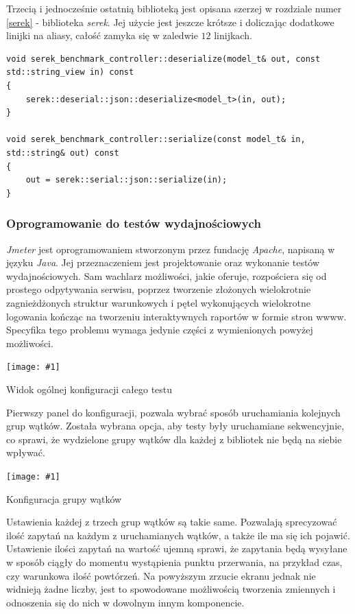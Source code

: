 \documentclass[12pt]{article}
\newcommand{\n}{\newline}
\newcommand{\putss}[3]{
\begin{screenshot}[H]
	\centering
	\texttt{[image: \#1]}
	\caption{#2}
	\label{#3}
	\medskip
\end{screenshot}
}
\newcommand{\nonpl}[1]{{\it #1}}
\newcommand{\Jmeter}{\nonpl{Jmeter}\texttrademark}
\newcommand{\serek}{\nonpl{serek}}
\begin{document}
{{{				Trzecią i jednocześnie ostatnią biblioteką jest opisana szerzej w rozdziale numer \ref{serek} - biblioteka \serek.
				Jej użycie jest jeszcze krótsze i doliczając dodatkowe linijki na aliasy, całość zamyka się w zaledwie $12$ linijkach.\n

				\begin{lstlisting}[frame=single]
void serek_benchmark_controller::deserialize(model_t& out, const std::string_view in) const
{
	serek::deserial::json::deserialize<model_t>(in, out);
}

void serek_benchmark_controller::serialize(const model_t& in, std::string& out) const
{
	out = serek::serial::json::serialize(in);
}
				\end{lstlisting}
			}

			{
				\subsubsection{Oprogramowanie do testów wydajnościowych}

				\Jmeter\cite{jmeter} jest oprogramowaniem stworzonym przez fundację \nonpl{Apache}, napisaną w języku \nonpl{Java}. Jej przeznaczeniem
				jest projektowanie oraz wykonanie testów wydajnościowych. Sam wachlarz możliwości, jakie oferuje, rozpościera się od prostego odpytywania serwisu, poprzez
				tworzenie złożonych wielokrotnie zagnieżdżonych struktur warunkowych i pętel wykonujących wielokrotne logowania kończąc na tworzeniu interaktywnych
				raportów w formie stron wwww. Specyfika tego problemu wymaga jedynie części z wymienionych powyżej możliwości.

				\putss{./img/jmeter_ss/main_pane.png}{ Widok ogólnej konfiguracji całego testu}{jmeter_main_config}

				Pierwszy panel do konfiguracji, pozwala wybrać sposób uruchamiania kolejnych grup wątków. Została wybrana opcja, aby testy były uruchamiane sekwencyjnie,
				co sprawi, że wydzielone grupy wątków dla każdej z bibliotek nie będą na siebie wpływać.\n

				\putss{./img/jmeter_ss/thread_group_config.png}{ Konfiguracja grupy wątków}{jmeter_thread_config}

				Ustawienia każdej z trzech grup wątków są takie same. Pozwalają sprecyzować ilość zapytań na każdym z uruchamianych wątków, a także ile ma się ich pojawić.
				Ustawienie ilości zapytań na wartość ujemną sprawi, że zapytania będą wysyłane w sposób ciągły do momentu wystąpienia punktu przerwania, na przykład czas, czy warunkowa
				ilość powtórzeń. Na powyższym zrzucie ekranu jednak nie widnieją żadne liczby, jest to spowodowane możliwością tworzenia zmiennych i odnoszenia się do nich w dowolnym innym
				komponencie.\n

}}}
\end{document}
